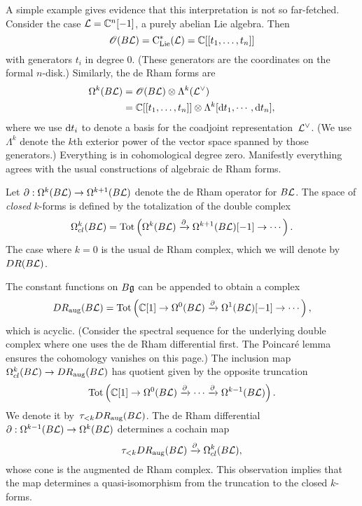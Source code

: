 \begin{eg}
A simple example gives evidence that this interpretation is not so far-fetched.
Consider the case $\mathcal L = \mathbb C^n [-1]$, a purely abelian Lie algebra.
Then
\[
\mathscr O(B \mathcal L) = {\rm C}_{{\rm Lie}}^*(\mathcal L) = \mathbb C[[t_1,\ldots,t_n]]
\]
with generators $t_i$ in degree 0.
(These generators are the coordinates on the formal $n$-disk.)
Similarly, the de Rham forms are
\begin{align*}
\Omega^k(B \mathcal L) 
&= \mathscr O(B \mathcal L)  \otimes \Lambda^k(\mathcal L^\vee) \\
 &=\mathbb C[[t_1,\ldots, t_n]] \otimes \Lambda^k[{\rm d} t_1, \cdots, {\rm d} t_n],
\end{align*}
where we use ${\rm d} t_i$ to denote a basis for the coadjoint representation~$\mathcal L^\vee$.
(We use $\Lambda^k$ denote the $k$th exterior power of the vector space spanned by those generators.)
Everything is in cohomological degree zero.
Manifestly everything agrees with the usual constructions of algebraic de Rham forms.
\end{eg}


Let $\partial : \Omega^{k}(B\mathcal L) \to \Omega^{k+1}(B\mathcal L)$ denote the de Rham operator for $B\mathcal L$. 
The space of {\em closed} $k$-forms is defined by the totalization of the double complex
\[
\Omega^{k}_{cl}(B \mathcal L) = {\rm Tot}\left( \Omega^k(B\mathcal L) \xrightarrow{\partial} \Omega^{k+1}(B \mathcal L)[-1] \to \cdots \right).
\]
The case where $k=0$ is the usual de Rham complex, which we will denote by~$DR(B\mathcal L)$.

The constant functions on $B\mathfrak g$ can be appended to obtain a complex
\[
DR_{\rm aug}(B\mathcal L) = {\rm Tot}\left( \mathbb C[1] \to \Omega^0(B\mathcal L) \xrightarrow{\partial} \Omega^{1}(B \mathcal L)[-1] \to \cdots \right),
\]
which is acyclic.
(Consider the spectral sequence for the underlying double complex where one uses the de Rham differential first. The Poincar\'e lemma ensures the cohomology vanishes on this page.)
The inclusion map $\Omega^{k}_{cl}(B \mathcal L) \to DR_{\rm aug}(B\mathcal L)$ has quotient given by the opposite truncation
\[
 {\rm Tot}\left( \mathbb C[1] \to \Omega^0(B\mathcal L) \xrightarrow{\partial} \cdots \xrightarrow{\partial} \Omega^{k-1}(B \mathcal L)\right).
\]
We denote it by~$\tau_{< k} DR_{\rm aug}(B \mathcal L)$. 
The de Rham differential $\partial: \Omega^{k-1}(B \mathcal L) \to \Omega^{k}(B \mathcal L)$ determines a cochain map
\[
\tau_{< k} DR_{\rm aug}(B \mathcal L) \xrightarrow{\partial} \Omega^{k}_{cl}(B \mathcal L),
\]
whose cone is the augmented de Rham complex.
This observation implies that the map determines a quasi-isomorphism from the truncation to the closed $k$-forms.

